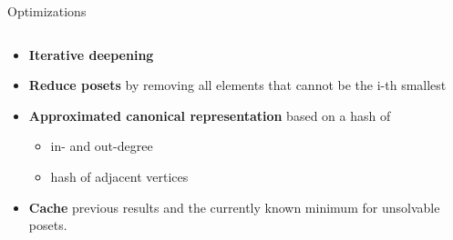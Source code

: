 \begin{frame}{Optimizations}
  \begin{columns}
    \begin{column}{0.6\textwidth}
      \begin{itemize}
        \item<1-> \textbf{Iterative deepening}
        \item<2-> \textbf{Reduce posets} by removing all elements that cannot be the i-th smallest
        \item<3-> \textbf{Approximated canonical representation} based on a hash of
          \begin{itemize}
            \item in- and out-degree
            \item hash of adjacent vertices
          \end{itemize}
        \item<4-> \textbf{Cache} previous results and the currently known minimum for unsolvable posets.
      \end{itemize}
    \end{column}

    \begin{column}{0.4\textwidth}
\end{column}
\end{columns}
\end{frame}
